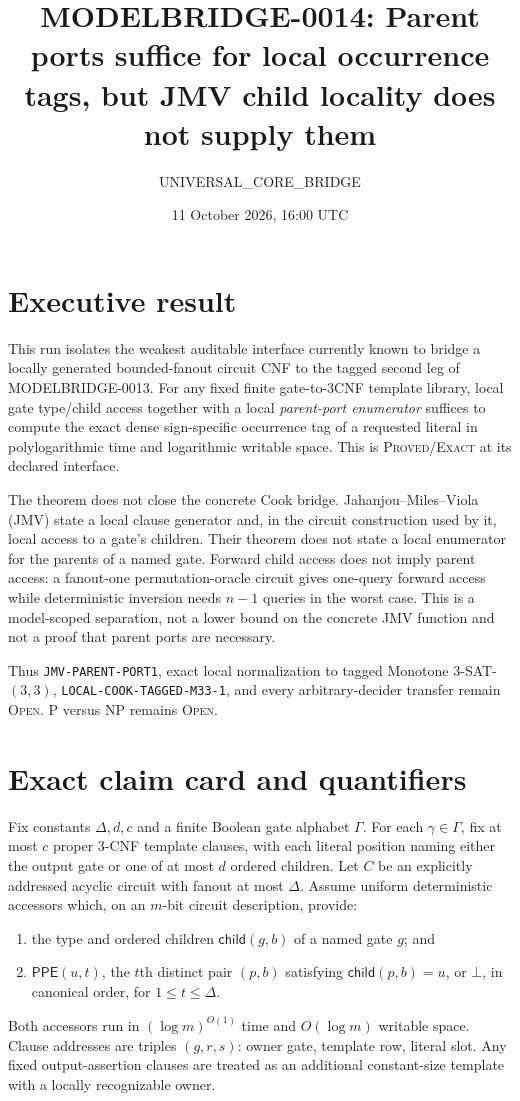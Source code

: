 \documentclass[11pt]{article}
\title{MODELBRIDGE-0014: Parent ports suffice for local occurrence tags, but JMV child locality does not supply them}
\author{UNIVERSAL\_CORE\_BRIDGE}
\date{11 October 2026, 16:00 UTC}
\newcommand{\status}[1]{\textsc{#1}}
\newcommand{\PPE}{\mathsf{PPE}}
\newcommand{\child}{\mathsf{child}}
\begin{document}
\maketitle

\section*{Executive result}

This run isolates the weakest auditable interface currently known to bridge a
locally generated bounded-fanout circuit CNF to the tagged second leg of
MODELBRIDGE-0013.  For any fixed finite gate-to-3CNF template library,
local gate type/child access together with a local \emph{parent-port
enumerator} suffices to compute the exact dense sign-specific occurrence tag
of a requested literal in polylogarithmic time and logarithmic writable
space.  This is \status{Proved/Exact} at its declared interface.

The theorem does not close the concrete Cook bridge.  Jahanjou--Miles--Viola
(JMV) state a local clause generator and, in the circuit construction used by
it, local access to a gate's children.  Their theorem does not state a local
enumerator for the parents of a named gate.  Forward child access does not
imply parent access: a fanout-one permutation-oracle circuit gives one-query
forward access while deterministic inversion needs $n-1$ queries in the
worst case.  This is a model-scoped separation, not a lower bound on the
concrete JMV function and not a proof that parent ports are necessary.

Thus \texttt{JMV-PARENT-PORT1}, exact local normalization to tagged Monotone
$3$-SAT-$(3,3)$, \texttt{LOCAL-COOK-TAGGED-M33-1}, and every arbitrary-decider
transfer remain \status{Open}.  P versus NP remains \status{Open}.

\section{Exact claim card and quantifiers}

Fix constants $\Delta,d,c$ and a finite Boolean gate alphabet $\Gamma$.  For
each $\gamma\in\Gamma$, fix at most $c$ proper 3-CNF template clauses, with
each literal position naming either the output gate or one of at most $d$
ordered children.  Let $C$ be an explicitly addressed acyclic circuit with
fanout at most $\Delta$.  Assume uniform deterministic accessors which, on
an $m$-bit circuit description, provide:
\begin{enumerate}[leftmargin=1.5em]
\item the type and ordered children $\child(g,b)$ of a named gate $g$; and
\item $\PPE(u,t)$, the $t$th distinct pair $(p,b)$ satisfying
      $\child(p,b)=u$, or $\bot$, in canonical order, for
      $1\le t\le\Delta$.
\end{enumerate}
Both accessors run in $(\log m)^{O(1)}$ time and $O(\log m)$ writable space.
Clause addresses are triples $(g,r,s)$: owner gate, template row, literal
slot.  Any fixed output-assertion clauses are treated as an additional
constant-size template with a locally recognizable owner.
\end{document}
